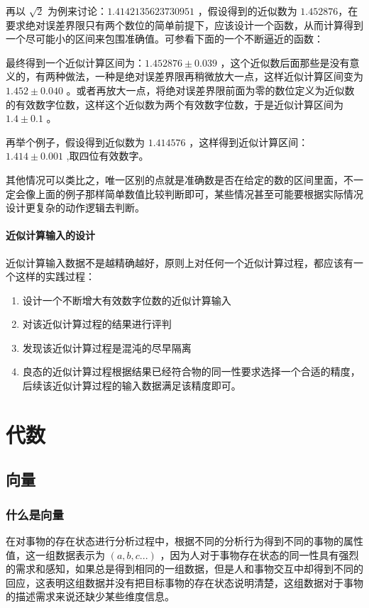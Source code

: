 \documentclass[12pt,oneside]{book}
\begin{document}
再以 $\sqrt{2}$ 为例来讨论：$ 1.4142135623730951 $ ，假设得到的近似数为 $ 1.452876 $，在要求绝对误差界限只有两个数位的简单前提下，应该设计一个函数，从而计算得到一个尽可能小的区间来包围准确值。可参看下面的一个不断逼近的函数：


最终得到一个近似计算区间为：$ 1.452876 \pm 0.039$ ，这个近似数后面那些是没有意义的，有两种做法，一种是绝对误差界限再稍微放大一点，这样近似计算区间变为 $ 1.452 \pm 0.040 $ 。或者再放大一点，将绝对误差界限前面为零的数位定义为近似数的有效数字位数，这样这个近似数为两个有效数字位数，于是近似计算区间为 $ 1.4 \pm 0.1 $ 。

再举个例子，假设得到近似数为 $ 1.414576 $ ，这样得到近似计算区间：$ 1.414 \pm 0.001 $ ,取四位有效数字。

其他情况可以类比之，唯一区别的点就是准确数是否在给定的数的区间里面，不一定会像上面的例子那样简单数值比较判断即可，某些情况甚至可能要根据实际情况设计更复杂的动作逻辑去判断。

\subsection{近似计算输入的设计}
近似计算输入数据不是越精确越好，原则上对任何一个近似计算过程，都应该有一个这样的实践过程：

\begin{enumerate}
\item 设计一个不断增大有效数字位数的近似计算输入
\item 对该近似计算过程的结果进行评判
\item 发现该近似计算过程是混沌的尽早隔离
\item 良态的近似计算过程根据结果已经符合物的同一性要求选择一个合适的精度，后续该近似计算过程的输入数据满足该精度即可。
\end{enumerate}




\part{代数}
\chapter{向量}
\section{什么是向量}
在对事物的存在状态进行分析过程中，根据不同的分析行为得到不同的事物的属性值，这一组数据表示为 $(a, b, c...)$ ，因为人对于事物存在状态的同一性具有强烈的需求和感知，如果总是得到相同的一组数据，但是人和事物交互中却得到不同的回应，这表明这组数据并没有把目标事物的存在状态说明清楚，这组数据对于事物的描述需求来说还缺少某些维度信息。
\end{document}
